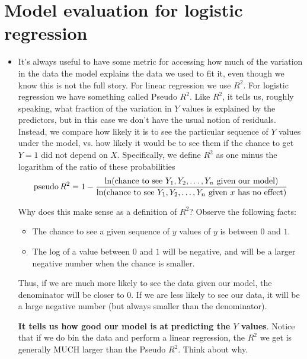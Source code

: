 %  
% 
% 
% 


\section{Model evaluation for logistic regression}
\begin{itemize}
\item It's always useful to have some metric for accessing how much of the variation in the data the model explains the data we used to fit it, even though we know this is not the full story. For linear regression we use $R^2$. For logistic regression we have something called Pseudo $R^2$. Like $R^2$, it tells us, roughly speaking, what fraction of the variation in $Y$ values is explained by the predictors, but in this case we don't have the usual notion of residuals. Instead, we compare how likely it is to see the particular sequence of $Y$ values under the model, vs. how likely it would be to see them if the chance to get $Y=1$ did not depend on $X$. Specifically, we define  $R^2$ as one minus the logarithm of the ratio of these probabilities 
\begin{equation}
{\rm pseudo}\, R^2 = 1- \frac{\ln( \text{chance to see $Y_1,Y_2,\dots,Y_n$ given our model})}{\ln (\text{chance to see $Y_1,Y_2,\dots,Y_n$ given $x$ has no effect})}
\end{equation}

Why does this make sense as a definition of $R^2$? Observe the following facts:
\begin{itemize}
\item  The chance to see a given sequence of $y$ values of $y$ is between $0$ and $1$. 
\item  The log of a value between $0$ and $1$ will be negative, and will be a larger negative number when the chance is smaller. 
\end{itemize}
Thus, if we are much more likely to see the data given our model, the denominator will be closer to $0$. If we are less likely to see our data, it will be a large negative number (but always smaller than the denominator). 

{\bf It tells us how good our model is at predicting the $Y$ values}. Notice that if we do bin the data and perform a linear regression, the $R^2$ we get is generally MUCH larger than the Pseudo $R^2$. Think about why. 

\end{itemize}

